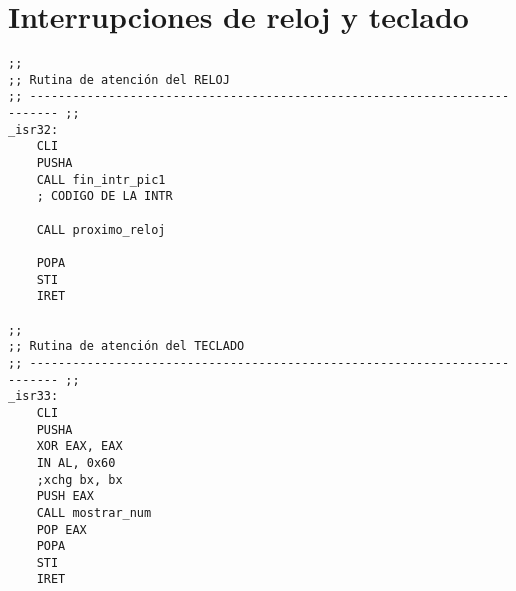 
\section{Interrupciones de reloj y teclado}

\begin{codesnippet}
\begin{verbatim}
;;
;; Rutina de atención del RELOJ
;; -------------------------------------------------------------------------- ;;
_isr32:
    CLI
    PUSHA
    CALL fin_intr_pic1
    ; CODIGO DE LA INTR

    CALL proximo_reloj

    POPA
    STI
    IRET

;;
;; Rutina de atención del TECLADO
;; -------------------------------------------------------------------------- ;;
_isr33:
	CLI
	PUSHA
	XOR EAX, EAX
	IN AL, 0x60
	;xchg bx, bx
	PUSH EAX
	CALL mostrar_num
	POP EAX
	POPA
	STI
	IRET
\end{verbatim}
\end{codesnippet}
